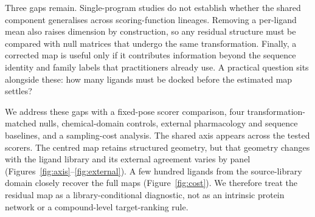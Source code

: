 Three gaps remain. Single-program studies do not establish whether the shared component
generalises across scoring-function lineages. Removing a per-ligand mean also raises dimension
by construction, so any residual structure must be compared with null matrices that undergo the
same transformation. Finally, a corrected map is useful only if it contributes information beyond
the sequence identity and family labels that practitioners already use. A practical question sits
alongside these: how many ligands must be docked before the estimated map settles?

We address these gaps with a fixed-pose scorer comparison, four transformation-matched nulls,
chemical-domain controls, external pharmacology and sequence baselines, and a sampling-cost analysis.
The shared axis appears across the tested scorers. The centred map retains structured geometry, but
that geometry changes with the ligand library and its external agreement varies by panel
(Figures~\ref{fig:axis}--\ref{fig:external}). A few hundred ligands from the source-library domain
closely recover the full maps (Figure~\ref{fig:cost}). We therefore treat the residual map as a
library-conditional diagnostic, not as an intrinsic protein network or a compound-level target-ranking
rule.
